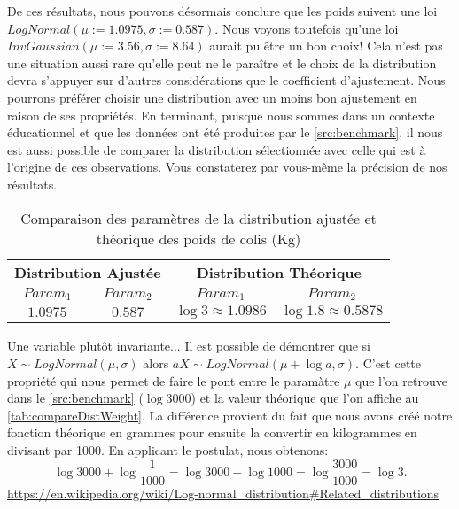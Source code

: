 De ces résultats, nous pouvons désormais conclure que les poids suivent une loi $LogNormal(\mu := 1.0975,\sigma := 0.587)$. Nous voyons toutefois qu'une loi $InvGaussian(\mu := 3.56,\sigma := 8.64)$ aurait pu être un bon choix! Cela n'est pas une situation aussi rare qu'elle peut ne le paraître et le choix de la distribution devra s'appuyer sur d'autres considérations que le coefficient d'ajustement. Nous pourrons préférer choisir une distribution avec un moins bon ajustement en raison de ses propriétés. En terminant, puisque nous sommes dans un contexte éducationnel et que les données ont été produites par le \autoref{src:benchmark}, il nous est aussi possible de comparer la distribution sélectionnée avec celle qui est à l'origine de ces observations. Vous constaterez par vous-même la précision de nos résultats. \\

\begin{table}
	\centering
	\begin{tabular}{cccc}
		\multicolumn{2}{c}{\textbf{Distribution Ajustée}} & \multicolumn{2}{c}{\textbf{Distribution Théorique}} \\
		\textbf{$Param_1$} & \textbf{$Param_2$} & \textbf{$Param_1$} & \textbf{$Param_2$} \\
		\hline
		$1.0975$ & $0.587$ & $\log{3} \approx 1.0986$ & $\log{1.8} \approx 0.5878$
	\end{tabular}
	\caption{Comparaison des paramètres de la distribution ajustée et théorique des poids de colis (Kg)}
	\label{tab:compareDistWeight}
\end{table}

\begin{moreInfo}{Une variable plutôt invariante...}
	Il est possible de démontrer que si $X \sim LogNormal(\mu,\sigma)$ alors $aX \sim LogNormal(\mu + \log{a},\sigma)$. C'est cette propriété qui nous permet de faire le pont entre le paramàtre $\mu$ que l'on retrouve dans le \autoref{src:benchmark} ($\log{3000}$) et la valeur théorique que l'on affiche au \autoref{tab:compareDistWeight}. La différence provient du fait que nous avons créé notre fonction théorique en grammes pour ensuite la convertir en kilogrammes en divisant par 1000. En applicant le postulat, nous obtenons: 
	$$\log{3000}+\log{\frac{1}{1000}} = \log{3000}-\log{1000} = \log{\frac{3000}{1000}} = \log{3}.$$
	\url{https://en.wikipedia.org/wiki/Log-normal_distribution#Related_distributions}
\end{moreInfo}